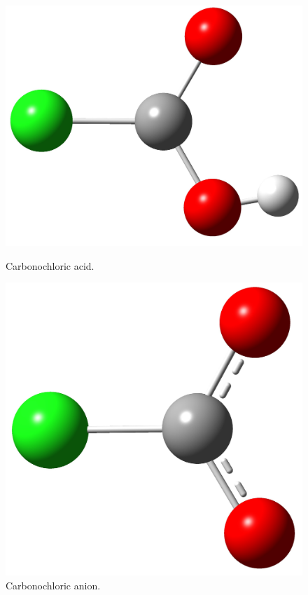 \documentclass[twocolumn]{article}
\begin{document}
\begin{figure}[h!]
\begin{minipage}[b]{0.225\textwidth}
          \includegraphics[scale=0.07]{carbonchloricAcid.jpg}
          \caption{Carbonochloric acid.}
        \end{minipage}
        \hfill
        \begin{minipage}[b]{0.225\textwidth}
          \centering
          \includegraphics[scale=0.06]{carbonochloricAnion.jpg}
          \caption{Carbonochloric anion.}
        \end{minipage}
    \end{figure}
\end{document}
